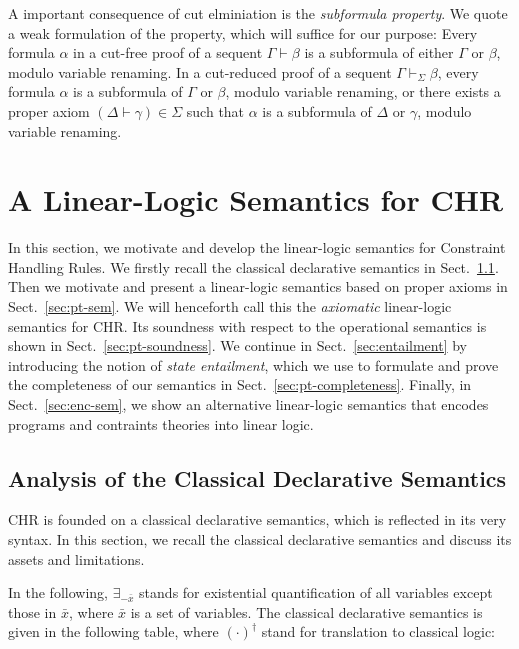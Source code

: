\documentclass[acmtocl]{acmtrans2m}
\begin{document}
A important consequence of cut elminiation is the \emph{subformula property}. We
quote a weak formulation of the property, which will suffice for our purpose:
Every formula $\alpha$ in a cut-free proof of a sequent $\Gamma\vdash\beta$ is a
subformula of either $\Gamma$ or $\beta$, modulo variable renaming. In a
cut-reduced proof of a sequent $\Gamma\vdash_\Sigma\beta$, every formula $\alpha$
 is a subformula of $\Gamma$ or $\beta$, modulo variable renaming, or there
exists a proper axiom $(\Delta\vdash\gamma)\in\Sigma$ such that $\alpha$ is a
subformula of $\Delta$ or $\gamma$, modulo variable renaming.

\section{A Linear-Logic Semantics for CHR}
\label{sec:ll_semantics}

In this section, we motivate and develop the linear-logic semantics for
Constraint Handling Rules. We firstly recall the classical declarative semantics
in Sect.~\ref{sec:classical-analysis}. Then we motivate and present a
linear-logic semantics based on proper axioms in Sect.~\ref{sec:pt-sem}. We will
henceforth call this the \emph{axiomatic} linear-logic semantics for CHR. Its
soundness with respect to the operational semantics is shown in
Sect.~\ref{sec:pt-soundness}. We continue in Sect.~\ref{sec:entailment} by
introducing the notion of \emph{state entailment}, which we use to formulate and
prove the completeness of our semantics in Sect.~\ref{sec:pt-completeness}.
Finally, in Sect.~\ref{sec:enc-sem}, we show an alternative linear-logic
semantics that encodes programs and contraints theories into linear logic.

\subsection{Analysis of the Classical Declarative Semantics}
  \label{sec:classical-analysis}

CHR is founded on a classical declarative semantics, which is reflected in its
very syntax. In this section, we recall the classical declarative semantics and
discuss its assets and limitations.

In the following, $\exists_{-\bar x}$ stands for existential quantification of
all variables except those in $\bar x$, where $\bar x$ is a set of variables.
The classical declarative semantics is given in the following table, where
$(\cdot)^\dagger$ stand for translation to classical logic:
\end{document}
